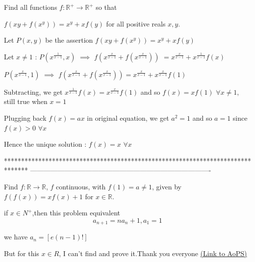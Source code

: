 \begin{solution}
	\begin{tcolorbox}Find all functions $f:\mathbb R^{+} \longrightarrow \mathbb R^{+}$ so that 

$f(xy + f(x^y)) = x^y + xf(y)$ for all positive reals $x,y$.\end{tcolorbox}
Let $P(x,y)$ be the assertion $f(xy+f(x^y))=x^y+xf(y)$

Let $x\ne 1$ :
$P(x^{\frac 1{x-1}},x)$ $\implies$ $f(x^{\frac x{x-1}}+f(x^{\frac x{x-1}}))$ $=x^{\frac x{x-1}}+x^{\frac 1{x-1}}f(x)$

$P(x^{\frac x{x-1}},1)$ $\implies$ $f(x^{\frac x{x-1}}+f(x^{\frac x{x-1}}))=x^{\frac x{x-1}}+x^{\frac x{x-1}}f(1)$

Subtracting, we get $x^{\frac 1{x-1}}f(x)=x^{\frac x{x-1}}f(1)$ and so $f(x)=xf(1)$ $\forall x\ne 1$, still true when $x=1$

Plugging back $f(x)=ax$ in original equation, we get $a^2=1$ and so $a=1$ since $f(x)>0$ $\forall x$

Hence the unique solution : $\boxed{f(x)=x}$ $\forall x$
\end{solution}
*******************************************************************************
-------------------------------------------------------------------------------

\begin{problem}
	Find $f : \mathbb{R} \to \mathbb{R}$, $f$ continuous, with $f(1)=a\neq 1$, given by  $f(f(x))=xf(x)+1$ for $x\in \mathbb{R}$.

if $x\in N^{+}$,then  this problem  equivalent
\[a_{n+1}=na_{n}+1,a_{1}=1\]

we have $a_{n}=[e(n-1)!]$

But for this $x\in R$, I can't find and prove it.Thank you everyone
	\flushright \href{https://artofproblemsolving.com/community/c6h536597}{(Link to AoPS)}
\end{problem}




